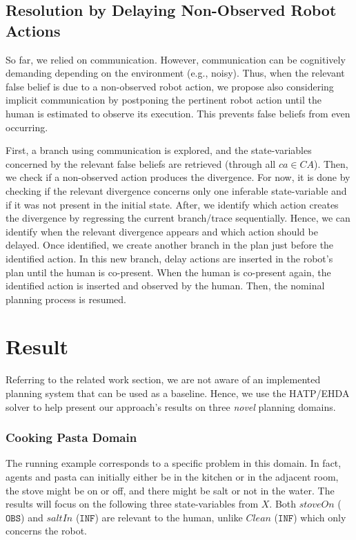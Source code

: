     \subsection{Resolution by Delaying Non-Observed Robot Actions}

So far, we relied on communication. However, communication can be cognitively demanding depending on the environment (e.g., noisy). 
Thus, when the relevant false belief is due to a non-observed robot action, we propose also considering implicit communication by postponing the pertinent robot action until the human is estimated to observe its execution. 
This prevents false beliefs from even occurring.

First, a branch using communication is explored, and the state-variables concerned by the relevant false beliefs are retrieved (through all $ca \in CA$).
Then, we check if a non-observed action produces the divergence. For now, it is done by checking if the relevant divergence concerns only one inferable state-variable and if it was not present in the initial state.   
After, we identify which action creates the divergence by regressing the current branch/trace sequentially. Hence, we can identify when the relevant divergence appears and which action should be delayed.
Once identified, we create another branch in the plan just before the identified action. In this new branch, {\sc delay} actions are inserted in the robot's plan until the human is co-present. When the human is co-present again, the identified action is inserted and observed by the human. Then, the nominal planning process is resumed.  

\section{Result}

Referring to the related work section, we are not aware of an implemented planning system that can be used as a baseline. Hence, we use the HATP/EHDA solver to help present our approach's results on three \textit{novel} planning domains.

\subsubsection{Cooking Pasta Domain}
The running example corresponds to a specific problem in this domain. In fact, agents and pasta can initially either be in the kitchen or in the adjacent room, the stove might be on or off, and there might be salt or not in the water.  
The results will focus on the following three state-variables from $X$. Both $stoveOn$ ($\texttt{OBS}$) and $saltIn$ ($\texttt{INF}$) are relevant to the human, unlike $Clean$ ($\texttt{INF}$) which only concerns the robot. 

